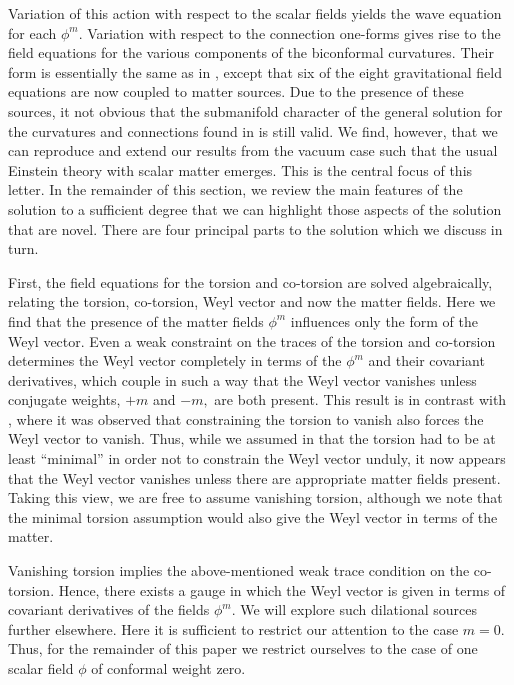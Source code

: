 \documentclass[a4paper,a4paper]{article}
\begin{document}
Variation of this action with respect to the scalar fields yields the wave
equation for each $\phi ^{m}$. Variation with respect to the connection
one-forms gives rise to the field equations for the various components of
the biconformal curvatures. Their form is essentially the same as in \cite
{WW}, except that six of the eight gravitational field equations are now
coupled to matter sources. Due to the presence of these sources, it not
obvious that the submanifold character of the general solution for the
curvatures and connections found in \cite{WW} is still valid. We find,
however, that we can reproduce and extend our results from the vacuum case
such that the usual Einstein theory with scalar matter emerges. This is the
central focus of this letter. In the remainder of this section, we review
the main features of the solution to a sufficient degree that we can
highlight those aspects of the solution that are novel. There are four
principal parts to the solution which we discuss in turn.

\smallskip

First, the field equations for the torsion and co-torsion are solved
algebraically, relating the torsion, co-torsion, Weyl vector and now the
matter fields. Here we find that the presence of the matter fields $\phi
^{m} $ influences only the form of the Weyl vector. Even a weak constraint
on the traces of the torsion and co-torsion determines the Weyl vector
completely in terms of the $\phi ^{m}$ and their covariant derivatives,
which couple in such a way that the Weyl vector vanishes unless conjugate
weights, $+m$ and $-m,$ are both present. This result is in contrast with 
\cite{WW}, where it was observed that constraining the torsion to vanish
also forces the Weyl vector to vanish. Thus, while we assumed in \cite{WW}
that the torsion had to be at least ``minimal'' in order not to constrain
the Weyl vector unduly, it now appears that the Weyl vector vanishes unless
there are appropriate matter fields present. Taking this view, we are free
to assume vanishing torsion, although we note that the minimal torsion
assumption would also give the Weyl vector in terms of the matter.

Vanishing torsion implies the above-mentioned weak trace condition on the
co-torsion. Hence, there exists a gauge in which the Weyl vector is given in
terms of covariant derivatives of the fields $\phi ^{m}$. We will explore
such dilational sources further elsewhere. Here it is sufficient to restrict
our attention to the case $m=0.$ Thus, for the remainder of this paper we
restrict ourselves to the case of one scalar field $\phi $ of conformal
weight zero.
\end{document}
